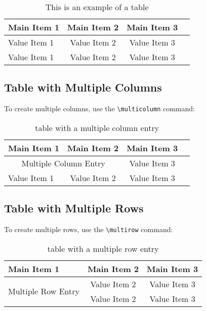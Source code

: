 \documentclass[]{nasa-latex-docs}
\begin{document}
\begin{table}[H]
   \caption{This is an example of a \latex table}
   \label{tab:TabEx}
   \begin{tabular}{lccr}
      \toprule[\heavyrulewidth]
      \toprule[\heavyrulewidth]
      \textbf{Main Item 1} & \textbf{Main Item 2} & \textbf{Main Item 3} \\
      \midrule
      Value Item 1 & Value Item 2 & Value Item 3 \\
      Value Item 1 & Value Item 2 & Value Item 3 \\
      \bottomrule[\heavyrulewidth]
   \end{tabular}
\end{table}

\subsection{Table with Multiple Columns}

To create multiple columns, use the \texttt{\textbackslash multicolumn} command:

\begin{table}[H]
   \caption{\latex table with a multiple column entry}
   \label{tab:TabEx2}
   \begin{tabular}{lccr}
      \toprule[\heavyrulewidth]
      \toprule[\heavyrulewidth]
      \textbf{Main Item 1} & \textbf{Main Item 2} & \textbf{Main Item 3} \\
      \midrule
      \multicolumn{2}{c}{Multiple Column Entry}  & Value Item 3 \\
      Value Item 1 & Value Item 2 & Value Item 3\\
      \bottomrule[\heavyrulewidth]
   \end{tabular}
\end{table}

\subsection{Table with Multiple Rows}

To create multiple rows, use the \texttt{\textbackslash multirow} command:

\begin{table}[H]
   \caption{\latex table with a multiple row entry}
   \label{tab:TabEx3}
   \begin{tabular}{lcc}
      \toprule[\heavyrulewidth]
      \toprule[\heavyrulewidth]
      \textbf{Main Item 1} & \textbf{Main Item 2} & \textbf{Main Item 3} \\
      \midrule
      \multirow{2}{*}{Multiple Row Entry} & Value Item 2 & Value Item 3 \\
      & Value Item 2 & Value Item 3 \\
      \bottomrule[\heavyrulewidth]
   \end{tabular}
\end{table}
\end{document}
